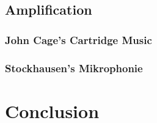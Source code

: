 \documentclass[titlepage]{scrartcl}
\begin{document}
    \subsection{Amplification}\label{amp}
    \subsubsection{John Cage's Cartridge Music~\citeyearpar{cage2013cm}} 
    
    \subsubsection{Stockhausen's Mikrophonie~\citeyearpar{stockhausen1995mmt}}

    \section{Conclusion}

    \printbibliography
\end{document}
